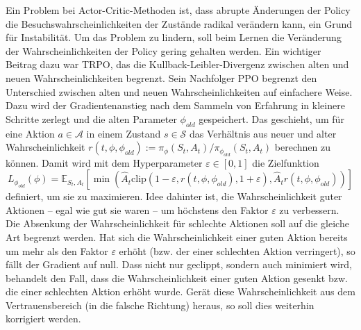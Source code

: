 Ein Problem bei Actor-Critic-Methoden ist, dass abrupte Änderungen der Policy die Besuchswahrscheinlichkeiten der Zustände radikal verändern kann, ein Grund für Instabilität.
Um das Problem zu lindern, soll beim Lernen die Veränderung der Wahrscheinlichkeiten der Policy gering gehalten werden.
Ein wichtiger Beitrag dazu war TRPO, das die Kullback-Leibler-Divergenz zwischen alten und neuen Wahrscheinlichkeiten begrenzt. \cite{trpo2015}
Sein Nachfolger PPO \cite{ppo2018} begrenzt den Unterschied zwischen alten und neuen Wahrscheinlichkeiten auf einfachere Weise. 
Dazu wird der Gradientenanstieg nach dem Sammeln von Erfahrung in kleinere Schritte zerlegt und die alten Parameter $\phi_{old}$ gespeichert.
Das geschieht, um für eine Aktion $a \in \mathcal{A}$ in einem Zustand $s \in \mathcal{S}$ das Verhältnis aus neuer und alter Wahrscheinlichkeit $r(t, \phi, \phi_{old}) := \pi_\phi(S_t, A_t) / \pi_{\phi_{old}}(S_t, A_t)$ berechnen zu können.
Damit wird mit dem Hyperparameter $\varepsilon \in [0, 1]$ die Zielfunktion
\begin{equation}
	L_{\phi_{old}}(\phi) = \mathbb{E}_{S_t, A_t}\left[\min{\left(\hat{A}_t \text{clip}{\left(1 - \varepsilon, r(t, \phi, \phi_{old}), 1 + \varepsilon\right)}, \hat{A}_t r(t, \phi, \phi_{old})\right)}\right]
\end{equation}
definiert, um sie zu maximieren.
Idee dahinter ist, die Wahrscheinlichkeit guter Aktionen -- egal wie gut sie waren -- um höchstens den Faktor $\varepsilon$ zu verbessern.
Die Absenkung der Wahrscheinlichkeit für schlechte Aktionen soll auf die gleiche Art begrenzt werden.
Hat sich die Wahrscheinlichkeit einer guten Aktion bereits um mehr als den Faktor $\varepsilon$ erhöht (bzw. der einer schlechten Aktion verringert), so fällt der Gradient auf null.
Dass nicht nur geclippt, sondern auch minimiert wird, behandelt den Fall, dass die Wahrscheinlichkeit einer guten Aktion gesenkt bzw. die einer schlechten Aktion erhöht wurde.
Gerät diese Wahrscheinlichkeit aus dem Vertrauensbereich (in die falsche Richtung) heraus, so soll dies weiterhin korrigiert werden.

